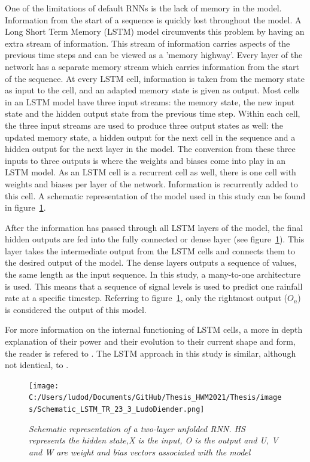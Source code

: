 \documentclass[twocolumn, 10pt, a4paper]{memoir}
\begin{document}
	One of the limitations of default RNNs is the lack of memory in the model. Information from the start of a sequence is quickly lost throughout the model. A Long Short Term Memory (LSTM) model circumvents this problem by having an extra stream of information. This stream of information carries aspects of the previous time steps and can be viewed as a 'memory highway'. Every layer of the network has a separate memory stream which carries information from the start of the sequence. At every LSTM cell, information is taken from the memory state as input to the cell, and an adapted memory state is given as output. Most cells in an LSTM model have three input streams: the memory state, the new input state and the hidden output state from the previous time step. Within each cell, the three input streams are used to produce three output states as well: the updated memory state, a hidden output for the next cell in the sequence and a hidden output for the next layer in the model. The conversion from these three inputs to three outputs is where the weights and biases come into play in an LSTM model. As an LSTM cell is a recurrent cell as well, there is one cell with weights and biases per layer of the network. Information is recurrently added to this cell. A schematic representation of the model used in this study can be found in figure~\ref{fig: multilayer RNN}.
	
	After the information has passed through all LSTM layers of the model, the final hidden outputs are fed into the fully connected or dense layer (see figure~\ref{fig: multilayer RNN}). This layer takes the intermediate output from the LSTM cells and connects them to the desired output of the model. The dense layers outputs a sequence of values, the same length as the input sequence. In this study, a many-to-one architecture is used. This means that a sequence of signal levels is used to predict one rainfall rate at a specific timestep. Referring to figure~\ref{fig: multilayer RNN}, only the rightmost output ($O_n$) is considered the output of this model.
	
	For more information on the internal functioning of LSTM cells, a more in depth explanation of their power and their evolution to their current shape and form, the reader is refered to .
	The LSTM approach in this study is similar, although not identical, to . 
	
	\begin{figure}
		\center
		\texttt{[image: C:/Users/ludod/Documents/GitHub/Thesis\_HWM2021/Thesis/images/Schematic\_LSTM\_TR\_23\_3\_LudoDiender.png]}
		\caption{\textit{Schematic representation of a two-layer unfolded RNN. HS represents the hidden state,X is the input, O is the output and U, V and W are weight and bias vectors associated with the model}}
		\label{fig: multilayer RNN}
	\end{figure}
	
\end{document}
